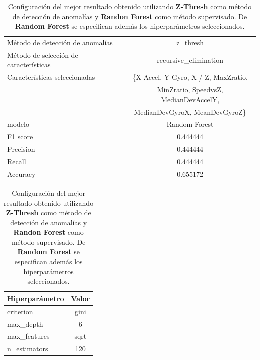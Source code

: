 \begin{appendices}
\begin{table}[htb]
		\end{table}
		\begin{table}[htb]
			\centering
			\caption{Configuración del mejor resultado obtenido utilizando \textbf{Z-Thresh} como método de detección de anomalías y \textbf{Randon Forest}
			como método supervisado. De \textbf{Random Forest} se especifican además los hiperparámetros seleccionados.}
			\label{table:33}
			\begin{tabular}{lc}
				\toprule
					  Método de detección de anomalías &                                           z\_thresh \\
				Método de selección de características &                              recursive\_elimination \\
						 Características seleccionadas & \{X Accel, Y Gyro, X / Z, MaxZratio, \\ 
						                               & MinZratio,  SpeedvsZ, MedianDevAccelY,  \\
													   &  MedianDevGyroX, MeanDevGyroZ\}\\
												modelo &                                      Random Forest \\
											  F1 score &                                           0.444444 \\
											 Precision &                                           0.444444 \\
												Recall &                                           0.444444 \\
											  Accuracy &                                           0.655172 \\
				\bottomrule
			\end{tabular}
			\newline
			\newline

			\begin{tabular}{lc}
				\toprule
				Hiperparámetro & Valor \\
				\midrule
					 criterion &  gini \\
					 max\_depth &     6 \\
				  max\_features &  sqrt \\
				  n\_estimators &   120 \\
				\bottomrule
			\end{tabular}
			
		\end{table}
		

\end{appendices}
